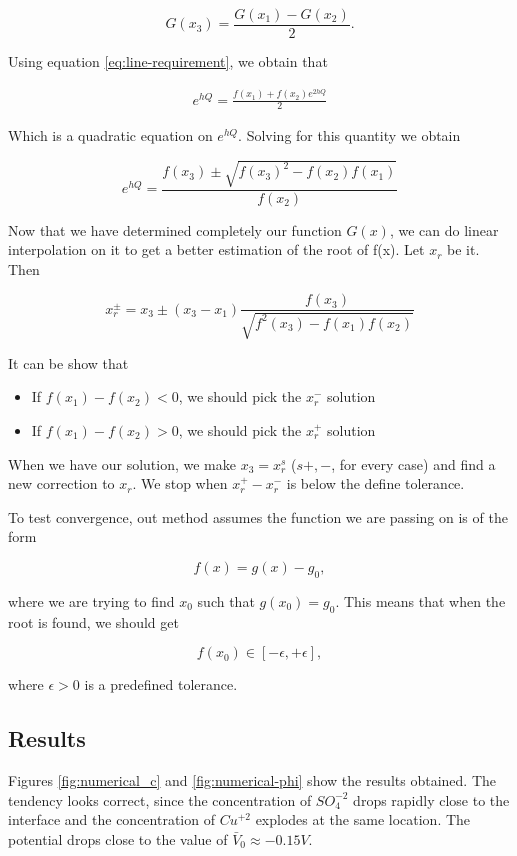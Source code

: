 \begin{equation}
G(x_3) = \frac{G(x_1)-G(x_2)}{2}.
\label{eq:line-requirement}
\end{equation}

Using equation \ref{eq:line-requirement}, we obtain that

\begin{eqnarray}
e^{hQ} = \frac{f(x_1)+f(x_2)e^{2hQ}}{2}
\end{eqnarray}

Which is a quadratic equation on $e^{hQ}$. Solving for this quantity we obtain

\begin{equation}
e^{hQ} = \frac{f(x_3)\pm\sqrt{f(x_3)^2-f(x_2)f(x_1)}}{f(x_2)}
\end{equation}

Now that we have determined completely our function $G(x)$, we can do linear interpolation on it to get a better estimation of the root of f(x). Let $x_r$  be it. Then

$$x_r^{\pm} = x_3 \pm (x_3-x_1)\frac{f(x_3)}{\sqrt{f^2(x_3)-f(x_1)f(x_2)}}$$

It can be show that 
\begin{itemize}
\item If $f(x_1)-f(x_2) < 0$, we should pick the $x_r^-$ solution
\item If $f(x_1)-f(x_2) > 0$, we should pick the $x_r^+$ solution
\end{itemize}

When we have our solution, we make $x_3 = x_r^{s}$ ($s+,-$, for every case) and find a new correction to $x_r$. We stop when $x_r^+-x_r^-$ is below the define tolerance.

To test convergence, out method assumes the function we are passing on is of the form

$$f(x) = g(x) -g_0,$$

where we are trying to find $x_0$ such that $g(x_0) = g_0$. This means that when the root is found, we should get 

$$f(x_0) \in [-\epsilon,+\epsilon],$$

where $\epsilon>0$ is a predefined tolerance.

\subsection{Results}

Figures \ref{fig:numerical_c} and \ref{fig:numerical-phi} show the results obtained. The tendency looks correct, since the concentration of $SO_4^{-2}$ drops rapidly close to the interface and the concentration of $Cu^{+2}$ explodes at the same location. The potential drops close to the value of $\bar{V}_0\approx -0.15 V$.


